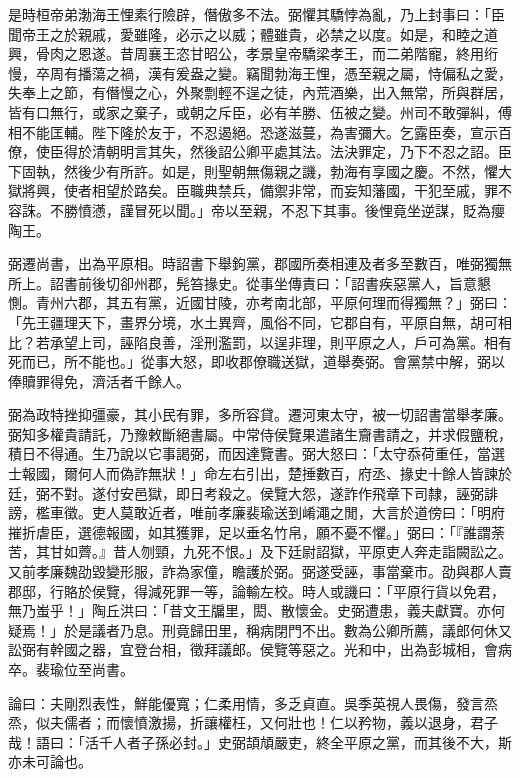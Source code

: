 \begin{pinyinscope}
是時桓帝弟渤海王悝素行險辟，僭傲多不法。弼懼其驕悖為亂，乃上封事曰：「臣聞帝王之於親戚，愛雖隆，必示之以威；體雖貴，必禁之以度。如是，和睦之道興，骨肉之恩遂。昔周襄王恣甘昭公，孝景皇帝驕梁孝王，而二弟階寵，終用绗慢，卒周有播蕩之禍，漢有爰盎之變。竊聞勃海王悝，憑至親之屬，恃偏私之愛，失奉上之節，有僭慢之心，外聚剽輕不逞之徒，內荒酒樂，出入無常，所與群居，皆有口無行，或家之棄子，或朝之斥臣，必有羊勝、伍被之變。州司不敢彈糾，傅相不能匡輔。陛下隆於友于，不忍遏絕。恐遂滋蔓，為害彌大。乞露臣奏，宣示百僚，使臣得於清朝明言其失，然後詔公卿平處其法。法決罪定，乃下不忍之詔。臣下固執，然後少有所許。如是，則聖朝無傷親之譏，勃海有享國之慶。不然，懼大獄將興，使者相望於路矣。臣職典禁兵，備禦非常，而妄知藩國，干犯至戚，罪不容誅。不勝憤懣，謹冒死以聞。」帝以至親，不忍下其事。後悝竟坐逆謀，貶為癭陶王。

弼遷尚書，出為平原相。時詔書下舉鉤黨，郡國所奏相連及者多至數百，唯弼獨無所上。詔書前後切卻州郡，髡笞掾史。從事坐傳責曰：「詔書疾惡黨人，旨意懇惻。青州六郡，其五有黨，近國甘陵，亦考南北部，平原何理而得獨無？」弼曰：「先王疆理天下，畫界分境，水土異齊，風俗不同，它郡自有，平原自無，胡可相比？若承望上司，誣陷良善，淫刑濫罰，以逞非理，則平原之人，戶可為黨。相有死而已，所不能也。」從事大怒，即收郡僚職送獄，道舉奏弼。會黨禁中解，弼以俸贖罪得免，濟活者千餘人。

弼為政特挫抑彊豪，其小民有罪，多所容貸。遷河東太守，被一切詔書當舉孝廉。弼知多權貴請託，乃豫敕斷絕書屬。中常侍侯覽果遣諸生齎書請之，并求假鹽稅，積日不得通。生乃說以它事謁弼，而因達覽書。弼大怒曰：「太守忝荷重任，當選士報國，爾何人而偽詐無狀！」命左右引出，楚捶數百，府丞、掾史十餘人皆諫於廷，弼不對。遂付安邑獄，即日考殺之。侯覽大怨，遂詐作飛章下司隸，誣弼誹謗，檻車徵。吏人莫敢近者，唯前孝廉裴瑜送到崤澠之閒，大言於道傍曰：「明府摧折虐臣，選德報國，如其獲罪，足以垂名竹帛，願不憂不懼。」弼曰：「『誰謂荼苦，其甘如薺。』昔人刎頸，九死不恨。」及下廷尉詔獄，平原吏人奔走詣闕訟之。又前孝廉魏劭毀變形服，詐為家僮，瞻護於弼。弼遂受誣，事當棄市。劭與郡人賣郡邸，行賂於侯覽，得減死罪一等，論輸左校。時人或譏曰：「平原行貨以免君，無乃蚩乎！」陶丘洪曰：「昔文王牖里，閎、散懷金。史弼遭患，義夫獻寶。亦何疑焉！」於是議者乃息。刑竟歸田里，稱病閉門不出。數為公卿所薦，議郎何休又訟弼有幹國之器，宜登台相，徵拜議郎。侯覽等惡之。光和中，出為彭城相，會病卒。裴瑜位至尚書。

論曰：夫剛烈表性，鮮能優寬；仁柔用情，多乏貞直。吳季英視人畏傷，發言烝烝，似夫儒者；而懷憤激揚，折讓權枉，又何壯也！仁以矜物，義以退身，君子哉！語曰：「活千人者子孫必封。」史弼頡頏嚴吏，終全平原之黨，而其後不大，斯亦未可論也。


\end{pinyinscope}
